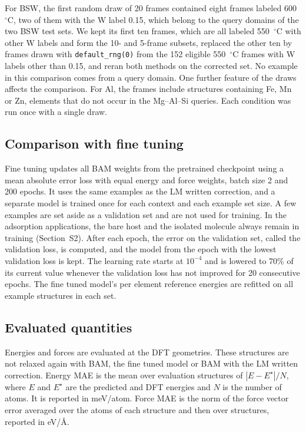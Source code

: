 For BSW, the first random draw of 20 frames contained eight frames labeled 600~$^{\circ}$C, two of them with the W label 0.15, which belong to the query domains of the two BSW test sets. We kept its first ten frames, which are all labeled 550~$^{\circ}$C with other W labels and form the 10- and 5-frame subsets, replaced the other ten by frames drawn with \texttt{default\_rng(0)} from the 152 eligible 550~$^{\circ}$C frames with W labels other than 0.15, and reran both methods on the corrected set. No example in this comparison comes from a query domain. One further feature of the draws affects the comparison. For Al, the frames include structures containing Fe, Mn or Zn, elements that do not occur in the Mg--Al--Si queries. Each condition was run once with a single draw.

\else
\subsection{Comparison with fine tuning}

Fine tuning updates all BAM weights from the pretrained checkpoint using a mean absolute error loss with equal energy and force weights, batch size 2 and 200 epochs. It uses the same examples as the LM written correction, and a separate model is trained once for each context and each example set size. A few examples are set aside as a validation set and are not used for training. In the adsorption applications, the bare host and the isolated molecule always remain in training (Section~S2). After each epoch, the error on the validation set, called the validation loss, is computed, and the model from the epoch with the lowest validation loss is kept. The learning rate starts at $10^{-4}$ and is lowered to 70\% of its current value whenever the validation loss has not improved for 20 consecutive epochs. The fine tuned model's per element reference energies are refitted on all example structures in each set.

\fi

\subsection{Evaluated quantities}
\label{sec:application-targets}

Energies and forces are evaluated at the DFT geometries. These structures are not relaxed again with BAM, the fine tuned model or BAM with the LM written correction.\ifbulk\else{} Energy MAE is the mean over evaluation structures of $|E-E^\star|/N$, where $E$ and $E^\star$ are the predicted and DFT energies and $N$ is the number of atoms. It is reported in meV/atom. Force MAE is the norm of the force vector error averaged over the atoms of each structure and then over structures, reported in eV/\AA.\fi

